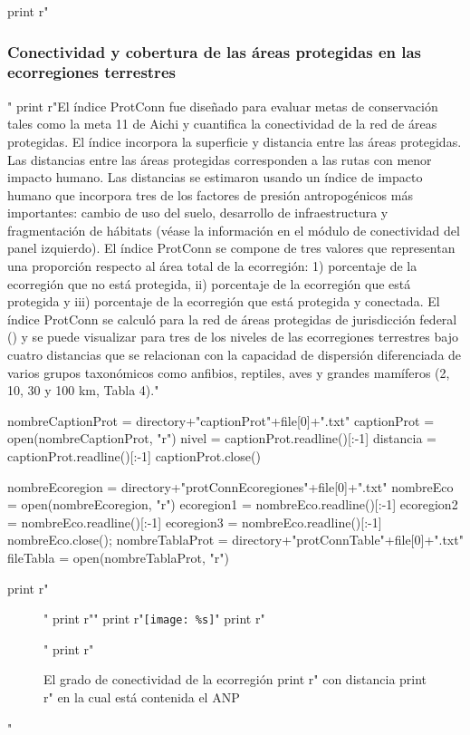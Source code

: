 \documentclass{article}
\begin{document}
\begin{python}
{{		   print r"\subsubsection{Conectividad y cobertura de las \'areas protegidas en las ecorregiones terrestres}"
		   print r"El \'indice ProtConn fue dise\~nado para evaluar metas de conservaci\'on tales como la meta 11 de Aichi y cuantifica la conectividad de la red de \'areas protegidas. El \'indice incorpora la superficie y distancia entre las \'areas protegidas. Las distancias entre las \'areas protegidas corresponden a las rutas con menor impacto humano. Las distancias se estimaron usando un \'indice de impacto humano que incorpora tres de los factores de presi\'on antropog\'enicos m\'as importantes: cambio de uso del suelo, desarrollo de infraestructura y fragmentaci\'on de h\'abitats (v\'ease la informaci\'on en el m\'odulo de conectividad del panel izquierdo). El \'indice ProtConn se compone de tres valores que representan una proporci\'on respecto al \'area total de la ecorregi\'on: 1) porcentaje de la ecorregi\'on que no est\'a protegida, ii) porcentaje de la ecorregi\'on que est\'a protegida y iii) porcentaje de la ecorregi\'on que est\'a protegida y conectada. El \'indice ProtConn se calcul\'o para la red de \'areas protegidas de jurisdicci\'on federal (\cite{Semarnat17}) y se puede visualizar para tres de los niveles de las ecorregiones terrestres bajo cuatro distancias que se relacionan con la capacidad de dispersi\'on diferenciada de varios grupos taxon\'omicos como anfibios, reptiles, aves y grandes mam\'iferos (2, 10, 30 y 100 km, Tabla 4)."


		   nombreCaptionProt = directory+"captionProt"+file[0]+".txt"
		   captionProt = open(nombreCaptionProt, "r")
		   nivel = captionProt.readline()[:-1]
		   distancia = captionProt.readline()[:-1]
		   captionProt.close()

		   nombreEcoregion = directory+"protConnEcoregiones"+file[0]+".txt"
		   nombreEco = open(nombreEcoregion, "r")
		   ecoregion1 = nombreEco.readline()[:-1]
		   ecoregion2 = nombreEco.readline()[:-1]
		   ecoregion3 = nombreEco.readline()[:-1]
		   nombreEco.close();
		   nombreTablaProt = directory+"protConnTable"+file[0]+".txt"
		   fileTabla = open(nombreTablaProt, "r")


		   print r"\begin{figure}[H]"
		   print r"\centering"
		   print r"\texttt{[image: \%s]}" %
		   print r"\caption{El grado de conectividad de la ecorregi\'on %
		   print r" con distancia %
		   print r" en la cual est\'a contenida el ANP}"
		   print r"\end{figure}"

}}
\end{python}
\end{document}
